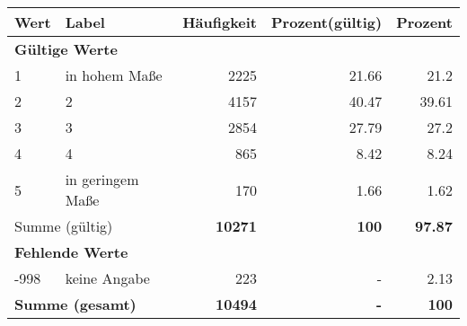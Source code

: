      \begin{longtable}{lXrrr}
     \toprule
     \textbf{Wert} & \textbf{Label} & \textbf{Häufigkeit} & \textbf{Prozent(gültig)} & \textbf{Prozent} \\
     \endhead
     \midrule
     \multicolumn{5}{l}{\textbf{Gültige Werte}}\\

     1 &
     \multicolumn{1}{X}{ in hohem Maße   } &


       \num{2225} &
       \num[round-mode=places,round-precision=2]{21,66} &
         \num[round-mode=places,round-precision=2]{21,2} \\

     2 &
     \multicolumn{1}{X}{ 2   } &


       \num{4157} &
       \num[round-mode=places,round-precision=2]{40,47} &
         \num[round-mode=places,round-precision=2]{39,61} \\

     3 &
     \multicolumn{1}{X}{ 3   } &


       \num{2854} &
       \num[round-mode=places,round-precision=2]{27,79} &
         \num[round-mode=places,round-precision=2]{27,2} \\

     4 &
     \multicolumn{1}{X}{ 4   } &


       \num{865} &
       \num[round-mode=places,round-precision=2]{8,42} &
         \num[round-mode=places,round-precision=2]{8,24} \\

     5 &
     \multicolumn{1}{X}{ in geringem Maße   } &


       \num{170} &
       \num[round-mode=places,round-precision=2]{1,66} &
         \num[round-mode=places,round-precision=2]{1,62} \\
     \midrule
     \multicolumn{2}{l}{Summe (gültig)} &
       \textbf{\num{10271}} &
     \textbf{100} &
       \textbf{\num[round-mode=places,round-precision=2]{97,87}} \\
     \multicolumn{5}{l}{\textbf{Fehlende Werte}}\\
       -998 &
       keine Angabe &
         \num{223} &
        - &
         \num[round-mode=places,round-precision=2]{2,13} \\
     \midrule
     \multicolumn{2}{l}{\textbf{Summe (gesamt)}} &
          \textbf{\num{10494}} &
        \textbf{-} &
        \textbf{100} \\
     \bottomrule
     \end{longtable}
     
